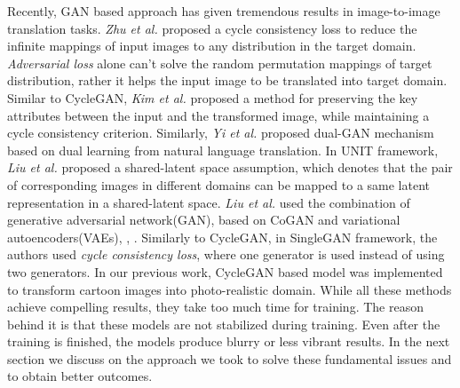 \documentclass[runningheads]{llncs}
\begin{document}
Recently, GAN\cite{DBLP:conf/nips/GoodfellowPMXWOCB14} based approach has given tremendous results in image-to-image translation tasks. \textit{Zhu et al.}\cite{DBLP:conf/iccv/ZhuPIE17} proposed a cycle consistency loss to reduce the infinite mappings of input images to any distribution in the target domain. \textit{Adversarial loss} alone can't solve the random permutation mappings of target distribution, rather it helps the input image to be translated into target domain. Similar to CycleGAN, \textit{Kim et al.} \cite{DBLP:conf/icml/KimCKLK17} proposed a method for preserving the key attributes between the input and the transformed image, while maintaining a cycle consistency criterion. Similarly,
\textit{Yi et al.} \cite{yi2017dualgan} proposed dual-GAN mechanism based on dual learning from natural language translation\cite{he2016dual}.
In UNIT\cite{DBLP:journals/corr/LiuBK17} framework, \textit{Liu et al.} proposed a shared-latent space assumption, which denotes that the pair of corresponding images in different domains can be mapped to a same latent representation in a shared-latent space. \textit{Liu et al.} used the combination of generative adversarial network(GAN), based on CoGAN\cite{liu2016coupled} and variational autoencoders(VAEs)\cite{kingma2013auto}, \cite{larsen2015autoencoding}, \cite{rezende2014stochastic}. Similarly to CycleGAN\cite{DBLP:conf/iccv/ZhuPIE17}, in SingleGAN\cite{DBLP:journals/corr/abs-1810-04991} framework, the authors used \textit{cycle consistency loss}\cite{DBLP:conf/iccv/ZhuPIE17}, where one generator is used instead of using two generators\cite{DBLP:conf/iccv/ZhuPIE17}.
In our previous work, CycleGAN based model was implemented to transform cartoon images into photo-realistic domain\cite{DBLP:journals/corr/abs-1811-11796}. While all these methods achieve compelling results, they take too much time for training. The reason behind it is that these models are not stabilized during training. Even after the training is finished, the models produce blurry or less vibrant results. In the next section we discuss on the approach we took to solve these fundamental issues and to obtain better outcomes.
\end{document}
